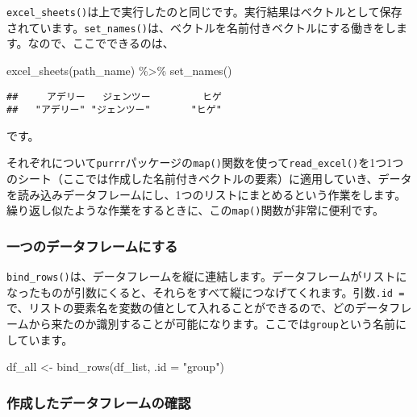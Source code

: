 \documentclass[
  xelatex,ja=standard, b5paper]{bxjsbook}
\newenvironment{Shaded}{\begin{snugshade}}{\end{snugshade}}
\newcommand{\AttributeTok}[1]{\textcolor[rgb]{0.77,0.63,0.00}{#1}}
\newcommand{\FunctionTok}[1]{\textcolor[rgb]{0.00,0.00,0.00}{#1}}
\newcommand{\NormalTok}[1]{#1}
\newcommand{\OtherTok}[1]{\textcolor[rgb]{0.56,0.35,0.01}{#1}}
\newcommand{\SpecialCharTok}[1]{\textcolor[rgb]{0.00,0.00,0.00}{#1}}
\newcommand{\StringTok}[1]{\textcolor[rgb]{0.31,0.60,0.02}{#1}}
\begin{document}
\texttt{excel\_sheets()}は上で実行したのと同じです。実行結果はベクトルとして保存されています。\texttt{set\_names()}は、ベクトルを名前付きベクトルにする働きをします。なので、ここでできるのは、

\begin{Shaded}
\begin{Highlighting}[]
\FunctionTok{excel\_sheets}\NormalTok{(path\_name) }\SpecialCharTok{\%\textgreater{}\%}                    
  \FunctionTok{set\_names}\NormalTok{()}
\end{Highlighting}
\end{Shaded}

\begin{verbatim}
##     アデリー   ジェンツー         ヒゲ 
##   "アデリー" "ジェンツー"       "ヒゲ"
\end{verbatim}

です。

それぞれについて\texttt{purrr}パッケージの\texttt{map()}関数を使って\texttt{read\_excel()}を1つ1つのシート（ここでは作成した名前付きベクトルの要素）に適用していき、データを読み込みデータフレームにし、1つのリストにまとめるという作業をします。繰り返し似たような作業をするときに、この\texttt{map()}関数が非常に便利です。

\hypertarget{onedflist}{%
\subsubsection{一つのデータフレームにする}\label{onedflist}}

\texttt{bind\_rows()}は、データフレームを縦に連結します。データフレームがリストになったものが引数にくると、それらをすべて縦につなげてくれます。引数\texttt{.id\ =}で、リストの要素名を変数の値として入れることができるので、どのデータフレームから来たのか識別することが可能になります。ここでは\texttt{group}という名前にしています。

\begin{Shaded}
\begin{Highlighting}[]
\NormalTok{df\_all }\OtherTok{\textless{}{-}} 
  \FunctionTok{bind\_rows}\NormalTok{(df\_list, }\AttributeTok{.id =} \StringTok{"group"}\NormalTok{)}
\end{Highlighting}
\end{Shaded}

\hypertarget{ux4f5cux6210ux3057ux305fux30c7ux30fcux30bfux30d5ux30ecux30fcux30e0ux306eux78baux8a8d}{%
\subsubsection{作成したデータフレームの確認}\label{ux4f5cux6210ux3057ux305fux30c7ux30fcux30bfux30d5ux30ecux30fcux30e0ux306eux78baux8a8d}}
\end{document}
